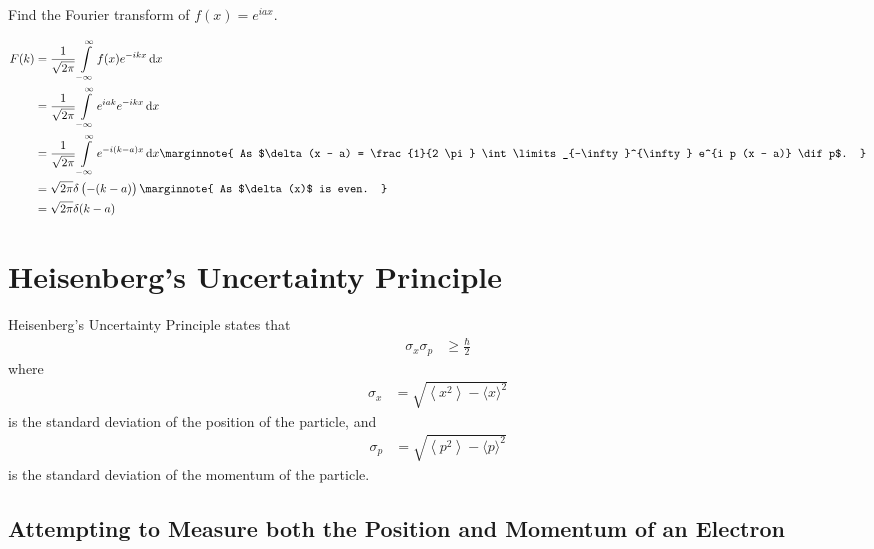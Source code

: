 \documentclass[titlepage, fleqn, a4paper, 12pt, twoside]{article}
\theoremstyle{definition}
\theoremstyle{theorem}
\let\Oldsection\section
\renewcommand{\section}{\FloatBarrier\Oldsection}
\let\Oldsubsection\subsection
\renewcommand{\subsection}{\FloatBarrier\Oldsubsection}
\begin{document}
\begin{question}
	Find the Fourier transform of $f(x) = e^{i a x}$.
\end{question}

\begin{solution}
	\begin{align*}
		F(k) &= \frac{1}{\sqrt{2 \pi}} \int\limits_{-\infty}^{\infty} f(x) e^{-i k x} \dif x\\
		&= \frac{1}{\sqrt{2 \pi}} \int\limits_{-\infty}^{\infty} e^{i a k} e^{-i k x} \dif x\\
		&= \frac{1}{\sqrt{2 \pi}} \int\limits_{-\infty}^{\infty} e^{-i (k - a) x} \dif x
		\marginnote
		{
			As $\delta(x - a) = \frac{1}{2 \pi} \int\limits_{-\infty}^{\infty} e^{i p (x - a)} \dif p$.
		}\\
		&= \sqrt{2 \pi} \delta\left( -(k - a) \right)
		\marginnote
		{
			As $\delta(x)$ is even.
		}\\
		&= \sqrt{2 \pi} \delta(k - a)
	\end{align*}
\end{solution}

\section{Heisenberg's Uncertainty Principle}

Heisenberg's Uncertainty Principle states that
\begin{align*}
	\sigma_x \sigma_p &\ge \frac{\hbar}{2}
\end{align*}
where
\begin{align*}
	\sigma_x &= \sqrt{\left\langle x^2 \right\rangle - {\langle x \rangle}^2}
\end{align*}
is the standard deviation of the position of the particle, and
\begin{align*}
	\sigma_p &= \sqrt{\left\langle p^2 \right\rangle - {\langle p \rangle}^2}
\end{align*}
is the standard deviation of the momentum of the particle.

\subsection{Attempting to Measure both the Position and Momentum of an Electron}
\end{document}
